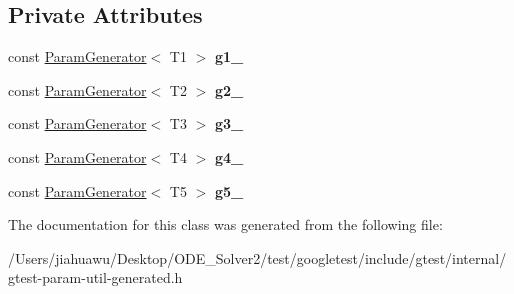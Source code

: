\subsection*{Private Attributes}
\begin{DoxyCompactItemize}
\item 
\mbox{\label{classtesting_1_1internal_1_1_cartesian_product_generator5_a0ede8fe915eb2d3eac08feefd0d7817d}} 
const \mbox{\hyperlink{classtesting_1_1internal_1_1_param_generator}{Param\+Generator}}$<$ T1 $>$ {\bfseries g1\+\_\+}
\item 
\mbox{\label{classtesting_1_1internal_1_1_cartesian_product_generator5_aff9ee5fd2bbe7a492980cf84300a7922}} 
const \mbox{\hyperlink{classtesting_1_1internal_1_1_param_generator}{Param\+Generator}}$<$ T2 $>$ {\bfseries g2\+\_\+}
\item 
\mbox{\label{classtesting_1_1internal_1_1_cartesian_product_generator5_a4a38199385399c6d98b1c0b5887af7e1}} 
const \mbox{\hyperlink{classtesting_1_1internal_1_1_param_generator}{Param\+Generator}}$<$ T3 $>$ {\bfseries g3\+\_\+}
\item 
\mbox{\label{classtesting_1_1internal_1_1_cartesian_product_generator5_a9cb2503ec2518e3b4fa6fa71ab3ead2b}} 
const \mbox{\hyperlink{classtesting_1_1internal_1_1_param_generator}{Param\+Generator}}$<$ T4 $>$ {\bfseries g4\+\_\+}
\item 
\mbox{\label{classtesting_1_1internal_1_1_cartesian_product_generator5_a09555c6b2edb292a8079366d8fe48a1d}} 
const \mbox{\hyperlink{classtesting_1_1internal_1_1_param_generator}{Param\+Generator}}$<$ T5 $>$ {\bfseries g5\+\_\+}
\end{DoxyCompactItemize}


The documentation for this class was generated from the following file\+:\begin{DoxyCompactItemize}
\item 
/\+Users/jiahuawu/\+Desktop/\+O\+D\+E\+\_\+\+Solver2/test/googletest/include/gtest/internal/gtest-\/param-\/util-\/generated.\+h\end{DoxyCompactItemize}
